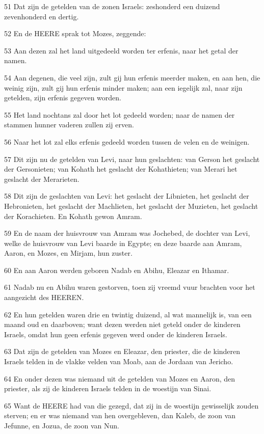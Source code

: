 \par 51 Dat zijn de getelden van de zonen Israels: zeshonderd een duizend zevenhonderd en dertig.
\par 52 En de HEERE sprak tot Mozes, zeggende:
\par 53 Aan dezen zal het land uitgedeeld worden ter erfenis, naar het getal der namen.
\par 54 Aan degenen, die veel zijn, zult gij hun erfenis meerder maken, en aan hen, die weinig zijn, zult gij hun erfenis minder maken; aan een iegelijk zal, naar zijn getelden, zijn erfenis gegeven worden.
\par 55 Het land nochtans zal door het lot gedeeld worden; naar de namen der stammen hunner vaderen zullen zij erven.
\par 56 Naar het lot zal elks erfenis gedeeld worden tussen de velen en de weinigen.
\par 57 Dit zijn nu de getelden van Levi, naar hun geslachten: van Gerson het geslacht der Gersonieten; van Kohath het geslacht der Kohathieten; van Merari het geslacht der Merarieten.
\par 58 Dit zijn de geslachten van Levi: het geslacht der Libnieten, het geslacht der Hebronieten, het geslacht der Machlieten, het geslacht der Muzieten, het geslacht der Korachieten. En Kohath gewon Amram.
\par 59 En de naam der huisvrouw van Amram was Jochebed, de dochter van Levi, welke de huisvrouw van Levi baarde in Egypte; en deze baarde aan Amram, Aaron, en Mozes, en Mirjam, hun zuster.
\par 60 En aan Aaron werden geboren Nadab en Abihu, Eleazar en Ithamar.
\par 61 Nadab nu en Abihu waren gestorven, toen zij vreemd vuur brachten voor het aangezicht des HEEREN.
\par 62 En hun getelden waren drie en twintig duizend, al wat mannelijk is, van een maand oud en daarboven; want dezen werden niet geteld onder de kinderen Israels, omdat hun geen erfenis gegeven werd onder de kinderen Israels.
\par 63 Dat zijn de getelden van Mozes en Eleazar, den priester, die de kinderen Israels telden in de vlakke velden van Moab, aan de Jordaan van Jericho.
\par 64 En onder dezen was niemand uit de getelden van Mozes en Aaron, den priester, als zij de kinderen Israels telden in de woestijn van Sinai.
\par 65 Want de HEERE had van die gezegd, dat zij in de woestijn gewisselijk zouden sterven; en er was niemand van hen overgebleven, dan Kaleb, de zoon van Jefunne, en Jozua, de zoon van Nun.


